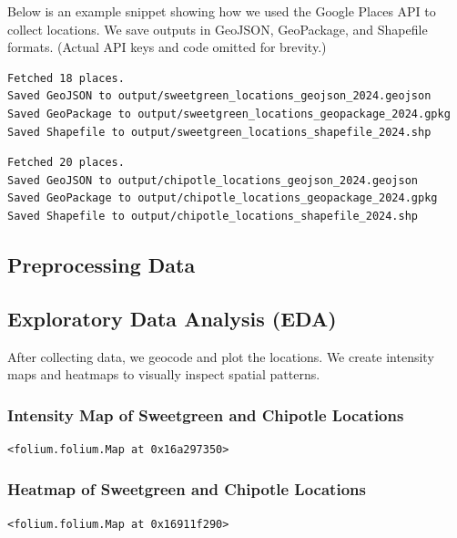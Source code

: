 \documentclass[
  letterpaper,
  DIV=11,
  numbers=noendperiod]{scrartcl}
\begin{document}
Below is an example snippet showing how we used the Google Places API to
collect locations. We save outputs in GeoJSON, GeoPackage, and Shapefile
formats. (Actual API keys and code omitted for brevity.)

\label{data_collection}
\begin{verbatim}
Fetched 18 places.
Saved GeoJSON to output/sweetgreen_locations_geojson_2024.geojson
Saved GeoPackage to output/sweetgreen_locations_geopackage_2024.gpkg
Saved Shapefile to output/sweetgreen_locations_shapefile_2024.shp
\end{verbatim}

\begin{verbatim}
Fetched 20 places.
Saved GeoJSON to output/chipotle_locations_geojson_2024.geojson
Saved GeoPackage to output/chipotle_locations_geopackage_2024.gpkg
Saved Shapefile to output/chipotle_locations_shapefile_2024.shp
\end{verbatim}

\subsection{Preprocessing Data}\label{preprocessing-data}

\subsection{Exploratory Data Analysis
(EDA)}\label{exploratory-data-analysis-eda}

After collecting data, we geocode and plot the locations. We create
intensity maps and heatmaps to visually inspect spatial patterns.

\subsubsection{Intensity Map of Sweetgreen and Chipotle
Locations}\label{intensity-map-of-sweetgreen-and-chipotle-locations}

\begin{verbatim}
<folium.folium.Map at 0x16a297350>
\end{verbatim}

\subsubsection{Heatmap of Sweetgreen and Chipotle
Locations}\label{heatmap-of-sweetgreen-and-chipotle-locations}

\begin{verbatim}
<folium.folium.Map at 0x16911f290>
\end{verbatim}
\end{document}
